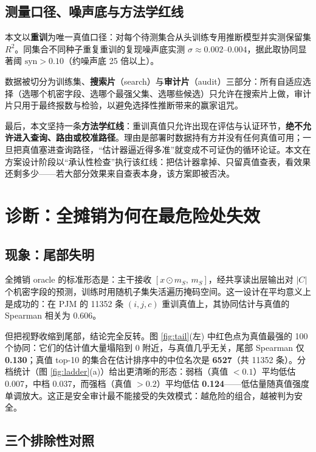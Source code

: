 \documentclass[10.5pt,compsoc,UTF8]{CjC}
\theoremstyle{mystyle}
\newcommand{\syn}{\mathrm{syn}}
\newcommand{\Rtwo}{R^{2}}
\begin{document}
\subsection{测量口径、噪声底与方法学红线}

本文以\textbf{重训}为唯一真值口径：对每个待测集合从头训练专用推断模型并实测保留集 $\Rtwo$。同集合不同种子重复重训的复现噪声底实测 $\sigma\approx0.002$--$0.004$，据此取协同显著阈 $\syn>0.10$（约噪声底 25 倍以上）。

数据被切分为训练集、\textbf{搜索片}（search）与\textbf{审计片}（audit）三部分：所有自适应选择（选哪个机密字段、选哪个最强父集、选哪些候选）只允许在搜索片上做，审计片只用于最终报数与检验，以避免选择性推断带来的赢家诅咒。

最后，本文坚持一条\textbf{方法学红线}：重训真值只允许出现在评估与认证环节，\textbf{绝不允许进入查询、路由或校准路径}。理由是部署时数据持有方并没有任何真值可用；一旦把真值塞进查询路径，“估计器逼近得多准”就变成不可证伪的循环论证。本文在方案设计阶段以“承认性检查”执行该红线：把估计器拿掉、只留真值查表，看效果还剩多少——若大部分效果来自查表本身，该方案即被否决。

\section{\heiti 诊断：全摊销为何在最危险处失效}

\subsection{现象：尾部失明}

全摊销 oracle 的标准形态是：主干接收 $[x\odot m_S,\,m_S]$，经共享读出层输出对 $|C|$ 个机密字段的预测，训练时用随机子集失活遍历掩码空间。这一设计在平均意义上是成功的：在 PJM 的 11352 条 $(i,j,c)$ 重训真值上，其协同估计与真值的 Spearman 相关为 0.606。

但把视野收缩到尾部，结论完全反转。图 \ref{fig:tail}(左) 中红色点为真值最强的 100 个协同：它们的估计值大量塌陷到 0 附近，与真值几乎无关，尾部 Spearman 仅 \textbf{0.130}；真值 top-10 的集合在估计排序中的中位名次是 \textbf{6527}（共 11352 条）。分档统计（图 \ref{fig:ladder}(a)）给出更清晰的形态：弱档（真值 $<0.1$）平均低估 0.007，中档 0.037，而强档（真值 $>0.2$）平均低估 \textbf{0.124}——低估量随真值强度单调放大。这正是安全审计最不能接受的失效模式：越危险的组合，越被判为安全。

\subsection{三个排除性对照}
\end{document}
